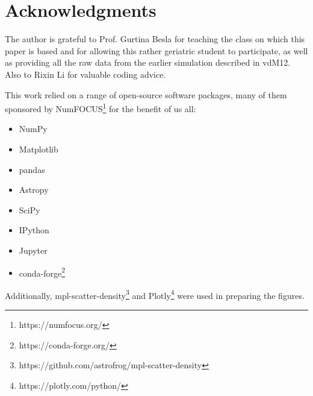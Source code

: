 \documentclass[twocolumn]{aastex63}
\newcommand{\todo}{\color{red}{TODO}\color{black}\hspace{2mm}}
\begin{document}
\todo{\textbf{\textit{add some!}}}



\section{Acknowledgments}

The author is grateful to Prof. Gurtina Besla for teaching the class on which this paper is based and for allowing this rather geriatric student to participate, as well as providing all the raw data from the earlier simulation described in vdM12. Also to Rixin Li for valuable coding advice.

This work relied on a range of open-source software packages, many of them sponsored by NumFOCUS\footnote{https://numfocus.org/} for the benefit of us all: 

\begin{itemize}
  \setlength\itemsep{-1mm}
	\item NumPy \citep{van_der_walt_numpy_2011}
	\item Matplotlib \citep{hunter_matplotlib_2007}
	\item pandas \citep{mckinney-proc-scipy-2010}
	\item Astropy \citep{astropy:2013}
	\item SciPy \citep{2020SciPy-NMeth}
	\item IPython \citep{perez_ipython_2007}
	\item Jupyter \citep{Kluyver:2016aa}
	\item conda-forge\footnote{https://conda-forge.org/}
\end{itemize}

 Additionally, mpl-scatter-density\footnote{https://github.com/astrofrog/mpl-scatter-density} and Plotly\footnote{https://plotly.com/python/} were used in preparing the figures.




{}

\end{document}
